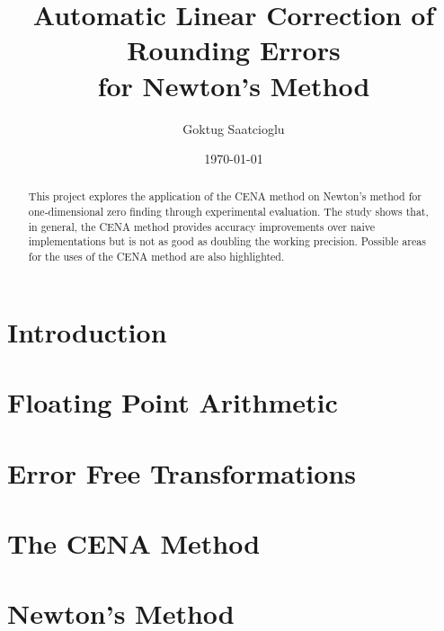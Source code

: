 \documentclass [12pt]{article}
\begin{document}

\title{Automatic Linear Correction of Rounding Errors\\
	   for Newton's Method}
\author{Goktug Saatcioglu}
\date{\today}
\maketitle

\begin{abstract}
This project explores the application of the CENA method on Newton's method for one-dimensional zero finding through experimental evaluation. The study shows that, in general, the CENA method provides accuracy improvements over naive implementations but is not as good as doubling the working precision. Possible areas for the uses of the CENA method are also highlighted.
\end{abstract}

\bigskip

\section{Introduction}
\label{sec:intro}

\section{Floating Point Arithmetic}
\label{sec:fpa}

\section{Error Free Transformations}
\label{sec:eft}

\section{The CENA Method}
\label{sec:cena}

\section{Newton's Method}
\label{sec:newton}

\end{document}
